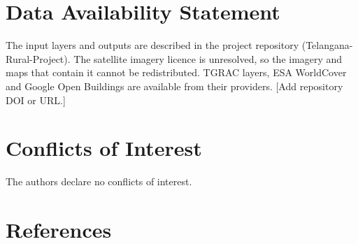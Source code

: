 \documentclass[11pt,a4paper]{article}
\providecommand{\needs}[1]{{\color{red}[#1]}}
\begin{document}
\section*{Data Availability Statement}
The input layers and outputs are described in the project repository (Telangana-Rural-Project). The satellite imagery licence is unresolved, so the imagery and maps that contain it cannot be redistributed. TGRAC layers, ESA WorldCover and Google Open Buildings are available from their providers. \needs{Add repository DOI or URL.}

\section*{Conflicts of Interest}
The authors declare no conflicts of interest.

\section*{References}

\end{document}
